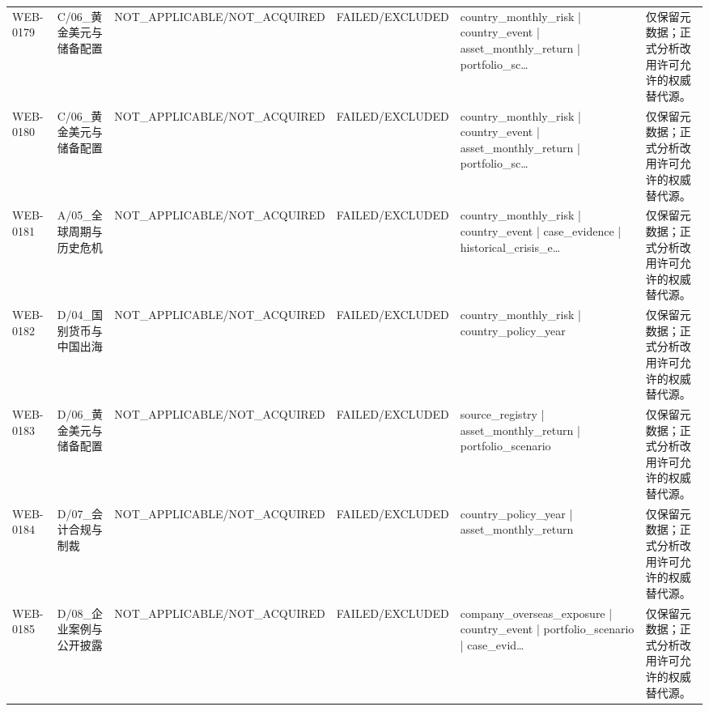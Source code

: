 \begin{landscape}
\begin{longtable}{p{1.8cm}p{2.6cm}p{2.6cm}p{2.6cm}p{4.8cm}p{7.2cm}}
WEB-0179 & C/\allowbreak{}06\_\allowbreak{}黄金美元与储备配置 & NOT\_\allowbreak{}APPLICABLE/\allowbreak{}NOT\_\allowbreak{}ACQUIRED & FAILED/\allowbreak{}EXCLUDED & country\_\allowbreak{}monthly\_\allowbreak{}risk | country\_\allowbreak{}event | asset\_\allowbreak{}monthly\_\allowbreak{}return | portfolio\_\allowbreak{}sc… & 仅保留元数据；正式分析改用许可允许的权威替代源。\\
WEB-0180 & C/\allowbreak{}06\_\allowbreak{}黄金美元与储备配置 & NOT\_\allowbreak{}APPLICABLE/\allowbreak{}NOT\_\allowbreak{}ACQUIRED & FAILED/\allowbreak{}EXCLUDED & country\_\allowbreak{}monthly\_\allowbreak{}risk | country\_\allowbreak{}event | asset\_\allowbreak{}monthly\_\allowbreak{}return | portfolio\_\allowbreak{}sc… & 仅保留元数据；正式分析改用许可允许的权威替代源。\\
WEB-0181 & A/\allowbreak{}05\_\allowbreak{}全球周期与历史危机 & NOT\_\allowbreak{}APPLICABLE/\allowbreak{}NOT\_\allowbreak{}ACQUIRED & FAILED/\allowbreak{}EXCLUDED & country\_\allowbreak{}monthly\_\allowbreak{}risk | country\_\allowbreak{}event | case\_\allowbreak{}evidence | historical\_\allowbreak{}crisis\_\allowbreak{}e… & 仅保留元数据；正式分析改用许可允许的权威替代源。\\
WEB-0182 & D/\allowbreak{}04\_\allowbreak{}国别货币与中国出海 & NOT\_\allowbreak{}APPLICABLE/\allowbreak{}NOT\_\allowbreak{}ACQUIRED & FAILED/\allowbreak{}EXCLUDED & country\_\allowbreak{}monthly\_\allowbreak{}risk | country\_\allowbreak{}policy\_\allowbreak{}year & 仅保留元数据；正式分析改用许可允许的权威替代源。\\
WEB-0183 & D/\allowbreak{}06\_\allowbreak{}黄金美元与储备配置 & NOT\_\allowbreak{}APPLICABLE/\allowbreak{}NOT\_\allowbreak{}ACQUIRED & FAILED/\allowbreak{}EXCLUDED & source\_\allowbreak{}registry | asset\_\allowbreak{}monthly\_\allowbreak{}return | portfolio\_\allowbreak{}scenario & 仅保留元数据；正式分析改用许可允许的权威替代源。\\
WEB-0184 & D/\allowbreak{}07\_\allowbreak{}会计合规与制裁 & NOT\_\allowbreak{}APPLICABLE/\allowbreak{}NOT\_\allowbreak{}ACQUIRED & FAILED/\allowbreak{}EXCLUDED & country\_\allowbreak{}policy\_\allowbreak{}year | asset\_\allowbreak{}monthly\_\allowbreak{}return & 仅保留元数据；正式分析改用许可允许的权威替代源。\\
WEB-0185 & D/\allowbreak{}08\_\allowbreak{}企业案例与公开披露 & NOT\_\allowbreak{}APPLICABLE/\allowbreak{}NOT\_\allowbreak{}ACQUIRED & FAILED/\allowbreak{}EXCLUDED & company\_\allowbreak{}overseas\_\allowbreak{}exposure | country\_\allowbreak{}event | portfolio\_\allowbreak{}scenario | case\_\allowbreak{}evid… & 仅保留元数据；正式分析改用许可允许的权威替代源。\\

\end{longtable}
\end{landscape}
